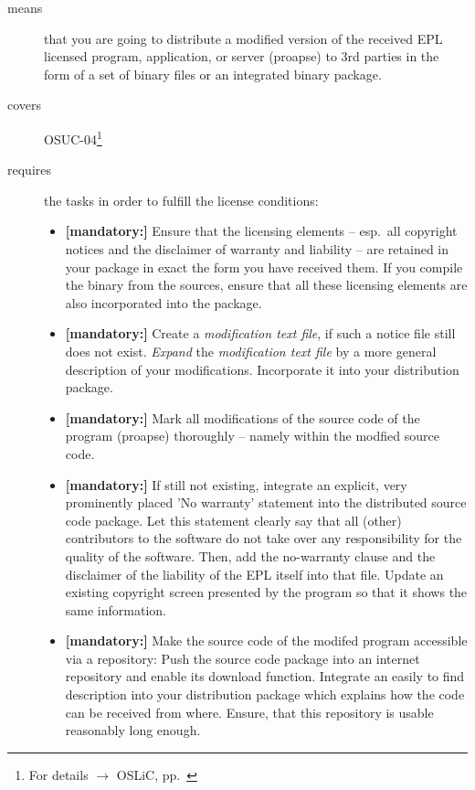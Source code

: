 \begin{description}
\item[means] that you are going to distribute a modified version of the received
EPL licensed pro\-gram, application, or server (proapse) to 3rd parties in
the form of a set of binary files or an integrated binary package.
\item[covers] OSUC-04\footnote{For details $\rightarrow$ OSLiC, pp.\ \pageref{OSUC-04-DEF}}
\item[requires] the tasks in order to fulfill the license conditions:
\begin{itemize}

  \item \textbf{[mandatory:]} Ensure that the licensing elements -- esp.\ all
  copyright notices and the disclaimer of warranty and liability -- are retained
  in your package in exact the form you have received them. If you compile the
  binary from the sources, ensure that all these licensing elements are also
  incorporated into the package.

  \item \textbf{[mandatory:]} Create a \emph{modification text file}, if such a
  notice file still does not exist. \emph{Expand} the \emph{modification text
  file} by a more general description of your modifications. Incorporate it into
  your distribution package.

  \item \textbf{[mandatory:]} Mark all modifications of the source code of the
  program (proapse) thoroughly -- namely within the
  modfied source code.

  \item \textbf{[mandatory:]} If still not existing, integrate an explicit, very
  prominently placed 'No warranty' statement into the distributed source code
  package. Let this statement clearly say that all (other) contributors to the
  software do not take over any responsibility for the quality of the software.
  Then, add the no-warranty clause and the disclaimer of the liability of the
  EPL itself into that file. Update an existing copyright screen presented by
  the program so that it shows the same information.

  \item \textbf{[mandatory:]} Make the source code of the modifed program
  accessible via a repository: Push the source code package into an internet
  repository and enable its download function. Integrate an easily to find
  description into your distribution package which explains how the code can be
  received from where. Ensure, that this repository is usable reasonably long
  enough.


\end{itemize}
\end{description}
